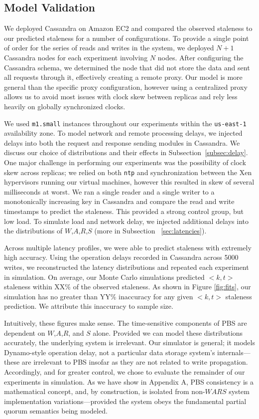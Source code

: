 \documentclass{vldb}
\begin{document}
\subsection{Model Validation}

We deployed Cassandra on Amazon EC2 and compared the observed
staleness to our predicted staleness for a number of configurations.
To provide a single point of order for the series of reads and writes
in the system, we deployed $N+1$ Cassandra nodes for each experiment
involving $N$ nodes.  After configuring the Cassandra schema, we
determined the node that did not store the data and sent all requests
through it, effectively creating a remote proxy.  Our model is more
general than the specific proxy configuration, however using a
centralized proxy allows us to avoid most issues with clock skew
between replicas and rely less heavily on globally synchronized
clocks.

We used \texttt{m1.small} instances throughout our experiments within
the \texttt{us-east-1} availability zone.  To model network and remote
processing delays, we injected delays into both the request and
response sending modules in Cassandra.  We discuss our choice of
distributions and their effects in Subsection~\ref{subsec:delay}.  One
major challenge in performing our experiments was the possibility of
clock skew across replicas; we relied on both \texttt{ntp} and
synchronization between the Xen hypervisors running our virtual
machines, however this resulted in skew of several milliseconds at
worst.  We ran a single reader and a single writer to a monotonically
increasing key in Cassandra and compare the read and write timestamps
to predict the staleness.  This provided a strong control group, but
low load.  To simulate load and network delay, we injected additional
delays into the distributions of $W$,$A$,$R$,$S$ (more in Subsection
~\ref{sec:latencies}).

Across multiple latency profiles, we were able to predict staleness
with extremely high accuracy.  Using the operation delays recorded in
Cassandra across 5000 writes, we reconstructed the latency
distributions and repeated each experiment in simulation.  On average,
our Monte Carlo simulations predicted $<k,t>$ staleness within XX\% of
the observed staleness.  As shown in Figure \ref{fig:fits}, our
simulation has no greater than YY\% inaccuracy for any given $<k,t>$
staleness prediction.  We attribute this inaccuracy to sample size.

Intuitively, these figures make sense.  The time-sensitive components
of PBS are dependent on $W$,$A$,$R$, and $S$ alone.  Provided we can
model these distributions accurately, the underlying system is
irrelevant.  Our simulator is general; it models Dynamo-style
operation delay, not a particular data storage system's
internals---these are irrelevant to PBS insofar as they are not
related to write propagation.  Accordingly, and for greater control,
we chose to evaluate the remainder of our experiments in simulation.
As we have show in Appendix A, PBS consistency is a mathematical
concept, and, by construction, is isolated from non-$WARS$ system
implementation variations---provided the system obeys the fundamental
partial quorum semantics being modeled.
\end{document}
